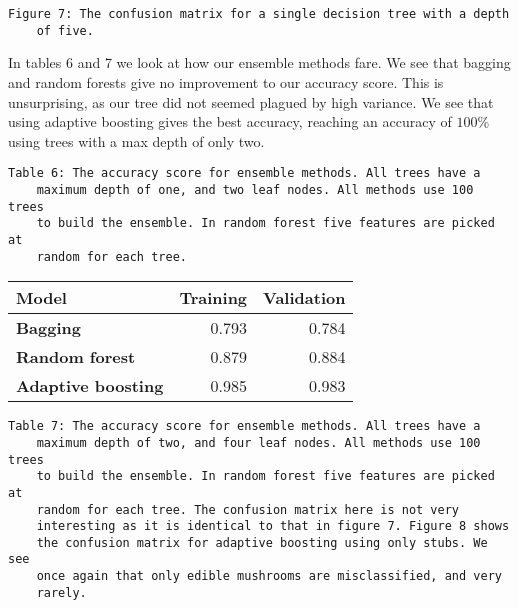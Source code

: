 \documentclass[11pt]{article}
\begin{document}
\begin{center}
\end{center}
\begin{Verbatim}[commandchars=\\\{\}]
	Figure 7: The confusion matrix for a single decision tree with a depth 
	of five.
\end{Verbatim}


In tables 6 and 7 we look at how our ensemble methods fare. We see that bagging and random forests give no improvement to our accuracy score. This is unsurprising, as our tree did not seemed plagued by high variance. We see that using adaptive boosting gives the best accuracy, reaching an accuracy of $100\%$ using trees with a max depth of only two.

\begin{Verbatim}[commandchars=\\\{\}]
	Table 6: The accuracy score for ensemble methods. All trees have a 
	maximum depth of one, and two leaf nodes. All methods use 100 trees 
	to build the ensemble. In random forest five features are picked at 
	random for each tree.
\end{Verbatim}
 
\begin{table}[h!]
	\begin{center}
		\label{tab:table1}
		\begin{tabular}{l|r|r}
			\textbf{Model}                                                 	& \textbf{Training} & \textbf{Validation}
			\\ \hline
			\textbf{Bagging}                             		             & 0.793        & 0.784              \\ \hline
			\textbf{Random forest}                                		     & 0.879        & 0.884              \\ \hline
			\textbf{Adaptive boosting}   							    	 & 0.985        & 0.983              \\ \hline
		\end{tabular}
	\end{center}
\end{table}

\begin{Verbatim}[commandchars=\\\{\}]
	Table 7: The accuracy score for ensemble methods. All trees have a 
	maximum depth of two, and four leaf nodes. All methods use 100 trees 
	to build the ensemble. In random forest five features are picked at 
	random for each tree. The confusion matrix here is not very 
	interesting as it is identical to that in figure 7. Figure 8 shows 
	the confusion matrix for adaptive boosting using only stubs. We see 
	once again that only edible mushrooms are misclassified, and very 
	rarely.
\end{Verbatim}
\end{document}
